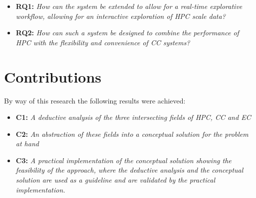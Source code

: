 \begin{itemize}
    \item \textbf{RQ1:} \textit{
              How can the system be extended to allow for a real-time explorative workflow, allowing for an interactive exploration of \ac{HPC} scale data?
          }
    \item \textbf{RQ2:} \textit{
              How can such a system be designed to combine the performance of \ac{HPC} with the flexibility and convenience of \ac{CC} systems?
          }

\end{itemize}


\section{Contributions}

By way of this research the following results were achieved:

\begin{itemize}
    \item \textbf{C1:} \textit{ A deductive analysis of the three intersecting fields of \ac{HPC}, \ac{CC} and \ac{EC} }
    \item \textbf{C2:} \textit{ An abstraction of these fields into a conceptual solution for the problem at hand}
    \item \textbf{C3:} \textit{ A practical implementation of the conceptual solution showing the feasibility of the approach, where the deductive analysis and the conceptual solution are used as a guideline and are validated by the practical implementation.}
\end{itemize}

\pagebreak
